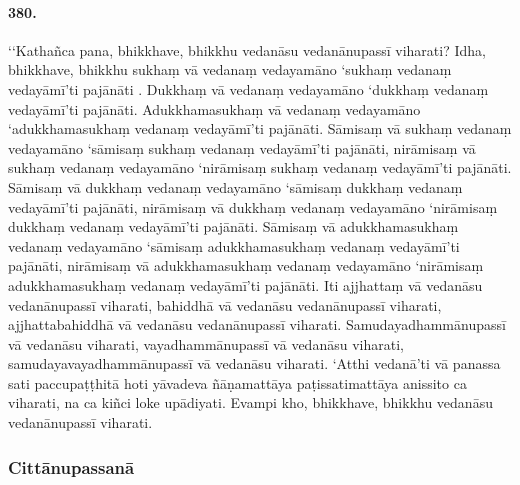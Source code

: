 \paragraph{380.} ‘‘Kathañca pana, bhikkhave, bhikkhu vedanāsu vedanānupassī viharati? Idha, bhikkhave, bhikkhu sukhaṃ vā vedanaṃ vedayamāno ‘sukhaṃ vedanaṃ vedayāmī’ti pajānāti . Dukkhaṃ vā vedanaṃ vedayamāno ‘dukkhaṃ vedanaṃ vedayāmī’ti pajānāti. Adukkhamasukhaṃ vā vedanaṃ vedayamāno ‘adukkhamasukhaṃ vedanaṃ vedayāmī’ti pajānāti. Sāmisaṃ vā sukhaṃ vedanaṃ vedayamāno ‘sāmisaṃ sukhaṃ vedanaṃ vedayāmī’ti pajānāti, nirāmisaṃ vā sukhaṃ vedanaṃ vedayamāno ‘nirāmisaṃ sukhaṃ vedanaṃ vedayāmī’ti pajānāti. Sāmisaṃ vā dukkhaṃ vedanaṃ vedayamāno ‘sāmisaṃ dukkhaṃ vedanaṃ vedayāmī’ti pajānāti, nirāmisaṃ vā dukkhaṃ vedanaṃ vedayamāno ‘nirāmisaṃ dukkhaṃ vedanaṃ vedayāmī’ti pajānāti. Sāmisaṃ vā adukkhamasukhaṃ vedanaṃ vedayamāno ‘sāmisaṃ adukkhamasukhaṃ vedanaṃ vedayāmī’ti pajānāti, nirāmisaṃ vā adukkhamasukhaṃ vedanaṃ vedayamāno ‘nirāmisaṃ adukkhamasukhaṃ vedanaṃ vedayāmī’ti pajānāti. Iti ajjhattaṃ vā vedanāsu vedanānupassī viharati, bahiddhā vā vedanāsu vedanānupassī viharati, ajjhattabahiddhā vā vedanāsu vedanānupassī viharati. Samudayadhammānupassī vā vedanāsu viharati, vayadhammānupassī vā vedanāsu viharati, samudayavayadhammānupassī vā vedanāsu viharati. ‘Atthi vedanā’ti vā panassa sati paccupaṭṭhitā hoti yāvadeva ñāṇamattāya paṭissatimattāya anissito ca viharati, na ca kiñci loke upādiyati. Evampi kho, bhikkhave, bhikkhu vedanāsu vedanānupassī viharati.


\subsubsection{Cittānupassanā}

